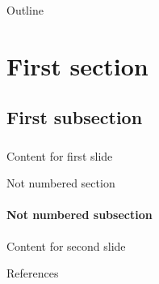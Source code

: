 \documentclass{beamer}
\title{}
\author{Juan Sebasti\'an C\'ardenas}
\institute[Universidad EAFIT]{Department of Sciences}
\theoremstyle{definition}
\theoremstyle{remark}
\newif\ifinsection
\newif\ifinsubsection
\let\oldsection\section
\renewcommand{\section}{%
  \global\insectiontrue%
  \global\insubsectionfalse%
  \oldsection}
\let\oldsubsection\subsection
\renewcommand{\subsection}{%
  \global\insubsectiontrue%
  \oldsubsection}
\newcommand {\aframe}[1] {%
  \begin{frame}
  \ifinsection\frametitle{\secname}\fi
  \ifinsubsection\framesubtitle{\subsecname}\fi
  #1
  \end{frame}
}
\begin{document}
\begin{frame}
  \titlepage
\end{frame}

\begin{frame}{Outline}
  \tableofcontents
\end{frame}

\section{First section}
\subsection{First subsection}
\aframe{Content for first slide}

\begin{frame}{Not numbered section}
  \framesubtitle{Not numbered subsection}
  Content for second slide
\end{frame}

\begin{frame}{References}
  
\end{frame}
\end{document}
